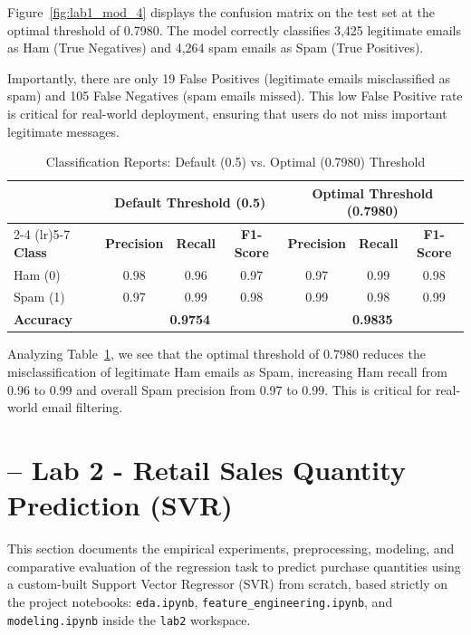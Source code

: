 \documentclass[12pt,a4paper]{article}
\begin{document}
Figure~\ref{fig:lab1_mod_4} displays the confusion matrix on the test set at the optimal threshold of 0.7980. The model correctly classifies 3,425 legitimate emails as Ham (True Negatives) and 4,264 spam emails as Spam (True Positives). 

Importantly, there are only 19 False Positives (legitimate emails misclassified as spam) and 105 False Negatives (spam emails missed). This low False Positive rate is critical for real-world deployment, ensuring that users do not miss important legitimate messages.

\begin{table}[H]
\centering
\caption{Classification Reports: Default (0.5) vs. Optimal (0.7980) Threshold}
\label{tab:class_reports}
\begin{tabular}{lcccccc}
\toprule
 & \multicolumn{3}{c}{\textbf{Default Threshold (0.5)}} & \multicolumn{3}{c}{\textbf{Optimal Threshold (0.7980)}} \\
\cmidrule(lr){2-4} \cmidrule(lr){5-7}
\textbf{Class} & \textbf{Precision} & \textbf{Recall} & \textbf{F1-Score} & \textbf{Precision} & \textbf{Recall} & \textbf{F1-Score} \\
\midrule
Ham (0) & 0.98 & 0.96 & 0.97 & 0.97 & 0.99 & 0.98 \\
Spam (1) & 0.97 & 0.99 & 0.98 & 0.99 & 0.98 & 0.99 \\
\midrule
\textbf{Accuracy} & \multicolumn{3}{c}{\textbf{0.9754}} & \multicolumn{3}{c}{\textbf{0.9835}} \\
\bottomrule
\end{tabular}
\end{table}

Analyzing Table~\ref{tab:class_reports}, we see that the optimal threshold of 0.7980 reduces the misclassification of legitimate Ham emails as Spam, increasing Ham recall from 0.96 to 0.99 and overall Spam precision from 0.97 to 0.99. This is critical for real-world email filtering.


\newpage
\section{-- Lab 2 - Retail Sales Quantity Prediction (SVR)}

This section documents the empirical experiments, preprocessing, modeling, and comparative evaluation of the regression task to predict purchase quantities using a custom-built Support Vector Regressor (SVR) from scratch, based strictly on the project notebooks: \texttt{eda.ipynb}, \texttt{feature\_engineering.ipynb}, and \texttt{modeling.ipynb} inside the \texttt{lab2} workspace.
\end{document}
